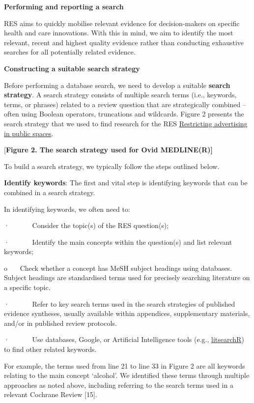 \documentclass[
  letterpaper,
  DIV=11,
  numbers=noendperiod]{scrreprt}
\begin{document}
\textbf{Performing and reporting a search}

RES aims to quickly mobilise relevant evidence for decision-makers on
specific health and care innovations. With this in mind, we aim to
identify the most relevant, recent and highest quality evidence rather
than conducting exhaustive searches for all potentially related
evidence.

\textbf{Constructing a suitable search strategy}

Before performing a database search, we need to develop a suitable
\textbf{search strategy}. A search strategy consists of multiple search
terms (i.e., keywords, terms, or phrases) related to a review question
that are strategically combined -- often using Boolean operators,
truncations and wildcards. Figure 2 presents the search strategy that we
used to find research for the RES
\href{https://arc-gm.nihr.ac.uk/media/Resources/ARC/Evaluation/RES/Implementing\%20policies\%20that\%20restrict\%20the\%20use\%20of\%20outdoor\%20spaces\%20for\%20advertising\%20harmful\%20commodities/ARC-GM\%20RES\%20outdoor\%20advertising\%20harmful\%20commodities\%20revised.pdf}{Restricting
advertising in public spaces}.

{[}\textbf{Figure 2. The search strategy used for Ovid MEDLINE(R){]}}

To build a search strategy, we typically follow the steps outlined
below.

\textbf{Identify keywords}: The first and vital step is identifying
keywords that can be combined in a search strategy.

In identifying keywords, we often need to:

·~~~~~~ Consider the topic(s) of the RES question(s);

·~~~~~~ Identify the main concepts within the question(s) and list
relevant keywords;

o~~~ Check whether a concept has MeSH subject headings using databases.
Subject headings are standardised terms used for precisely searching
literature on a specific topic.

·~~~~~~ Refer to key search terms used in the search strategies of
published evidence syntheses, usually available within appendices,
supplementary materials, and/or in published review protocols.

·~~~~~~ Use databases, Google, or Artificial Intelligence tools (e.g.,
\href{https://elizagrames.github.io/litsearchr/}{litsearchR}) to find
other related keywords.

For example, the terms used from line 21 to line 33 in Figure 2 are all
keywords relating to the main concept `alcohol'. We identified these
terms through multiple approaches as noted above, including referring to
the search terms used in a relevant Cochrane Review {[}15{]}.
\end{document}
